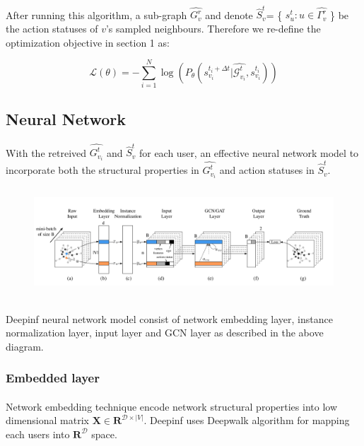 \paragraph{} After running this algorithm, a sub-graph $\hat{G_v^r}$ and denote $\hat{S}_v^t$=
\{ $s_u^t :u \in \hat{\Gamma_v^r}$ \} be the action statuses of $v$'s sampled neighbours. Therefore we re-define the optimization
objective in section 1 as:

\begin{equation}
    \mathcal{L}(\theta) = -\sum_{i=1}^N \log(P_{\theta}(s_{v_i}^{t_i+\Delta t}|\hat{\mathcal{G}_{v_i}^{t}},s_{v_i}^{t_i}))
\end{equation}


\subsection{Neural Network}
\paragraph{} With the retreived $\hat{G_{v_i}^{t}}$ and $\hat{S}_v^t$ for each user, an effective
neural network model to incorporate both the structural properties in $\hat{G_{v_i}^{t}}$ and action statuses in 
$\hat{S}_v^t$.

\begin{figure}
    \includegraphics[width=12cm,height=4cm]{tex/img/framework.png}
\end{figure}

\paragraph{} Deepinf neural network model consist of network embedding layer, instance normalization layer, input layer
and GCN layer as described in the above diagram.


\subsubsection{Embedded layer}

\paragraph{} Network embedding technique encode network structural properties into low dimensional matrix $\mathbf{X} \in
\mathbf{R}^{\mathcal{D} \times |V|}$. Deepinf uses Deepwalk algorithm for mapping each users into $\mathbf{R}^{\mathcal{D}}$
space.


